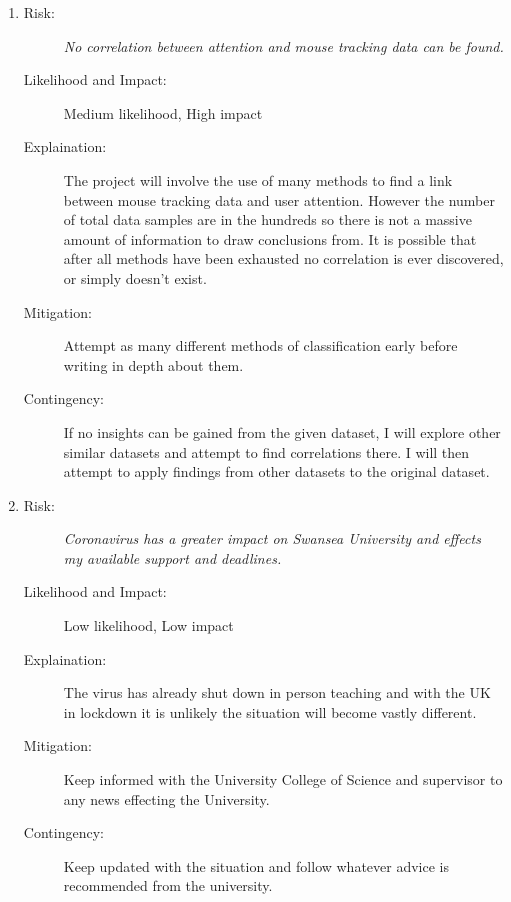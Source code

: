 \documentclass{article}
\begin{document}
\begin{enumerate}
    \item 
    \begin{description}
        \item[Risk:]    %
        \emph{No correlation between attention and mouse tracking data can be found.}    
        \item[Likelihood and Impact:]
        Medium likelihood, High impact
        \item[Explaination:]
        The project will involve the use of many methods to find a link between mouse tracking data and user attention.
        However the number of total data samples are in the hundreds so there is not a massive amount of information to draw conclusions from.
        It is possible that after all methods have been exhausted no correlation is ever discovered, or simply doesn't exist. 
        \item[Mitigation:]
        Attempt as many different methods of classification early before writing in depth about them.  
        \item[Contingency:]
        If no insights can be gained from the given dataset, I will explore other similar datasets and attempt to find correlations there.
        I will then attempt to apply findings from other datasets to the original dataset. 
    \end{description}

    \item 
    \begin{description}
        \item[Risk:]    
        \emph{Coronavirus has a greater impact on Swansea University and effects my available support and deadlines.}
        \item[Likelihood and Impact:]
        Low likelihood, Low impact
        \item[Explaination:]
        The virus has already shut down in person teaching and with the UK in lockdown it is unlikely the situation will become vastly different. 
        \item[Mitigation:]
        Keep informed with the University College of Science and supervisor to any news effecting the University.
        \item[Contingency:]
        Keep updated with the situation and follow whatever advice is recommended from the university.
    \end{description}

\end{enumerate}
\end{document}

